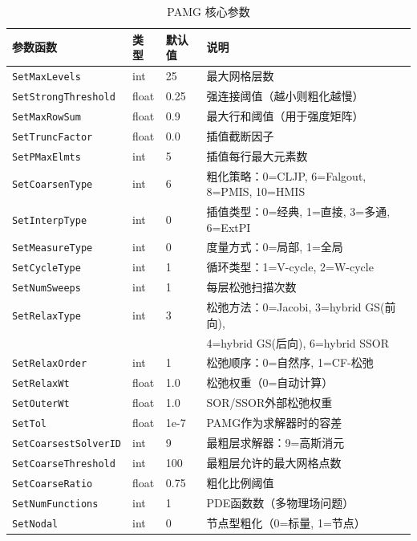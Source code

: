 \documentclass[12pt,a4paper]{article}
\begin{document}
\begin{table}[htbp]
\centering
\caption{PAMG 核心参数}
\label{tab:params_pamg_core}
\begin{tabular}{llll}
\toprule
参数函数 & 类型 & 默认值 & 说明 \\
\midrule
\texttt{SetMaxLevels} & int & 25 & 最大网格层数 \\
\texttt{SetStrongThreshold} & float & 0.25 & 强连接阈值（越小则粗化越慢） \\
\texttt{SetMaxRowSum} & float & 0.9 & 最大行和阈值（用于强度矩阵） \\
\texttt{SetTruncFactor} & float & 0.0 & 插值截断因子 \\
\texttt{SetPMaxElmts} & int & 5 & 插值每行最大元素数 \\
\texttt{SetCoarsenType} & int & 6 & 粗化策略：0=CLJP, 6=Falgout, 8=PMIS, 10=HMIS \\
\texttt{SetInterpType} & int & 0 & 插值类型：0=经典, 1=直接, 3=多通, 6=ExtPI \\
\texttt{SetMeasureType} & int & 0 & 度量方式：0=局部, 1=全局 \\
\texttt{SetCycleType} & int & 1 & 循环类型：1=V-cycle, 2=W-cycle \\
\texttt{SetNumSweeps} & int & 1 & 每层松弛扫描次数 \\
\texttt{SetRelaxType} & int & 3 & 松弛方法：0=Jacobi, 3=hybrid GS(前向), \\
  &   &   & 4=hybrid GS(后向), 6=hybrid SSOR \\
\texttt{SetRelaxOrder} & int & 1 & 松弛顺序：0=自然序, 1=CF-松弛 \\
\texttt{SetRelaxWt} & float & 1.0 & 松弛权重（0=自动计算） \\
\texttt{SetOuterWt} & float & 1.0 & SOR/SSOR外部松弛权重 \\
\texttt{SetTol} & float & 1e-7 & PAMG作为求解器时的容差 \\
\texttt{SetCoarsestSolverID} & int & 9 & 最粗层求解器：9=高斯消元 \\
\texttt{SetCoarseThreshold} & int & 100 & 最粗层允许的最大网格点数 \\
\texttt{SetCoarseRatio} & float & 0.75 & 粗化比例阈值 \\
\texttt{SetNumFunctions} & int & 1 & PDE函数数（多物理场问题） \\
\texttt{SetNodal} & int & 0 & 节点型粗化（0=标量, 1=节点） \\
\bottomrule
\end{tabular}
\end{table}
\end{document}
